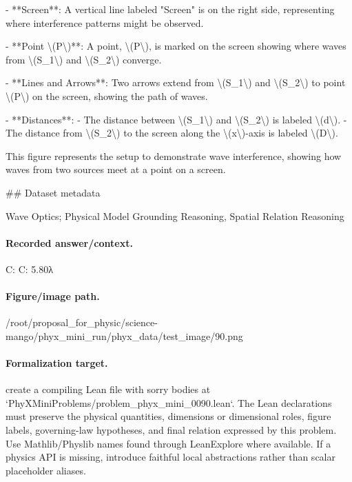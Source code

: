 - **Screen**: A vertical line labeled "Screen" is on the right side, representing where interference patterns might be observed.

- **Point \textbackslash{}(P\textbackslash{})**: A point, \textbackslash{}(P\textbackslash{}), is marked on the screen showing where waves from \textbackslash{}(S\_1\textbackslash{}) and \textbackslash{}(S\_2\textbackslash{}) converge.

- **Lines and Arrows**: Two arrows extend from \textbackslash{}(S\_1\textbackslash{}) and \textbackslash{}(S\_2\textbackslash{}) to point \textbackslash{}(P\textbackslash{}) on the screen, showing the path of waves.

- **Distances**: 
  - The distance between \textbackslash{}(S\_1\textbackslash{}) and \textbackslash{}(S\_2\textbackslash{}) is labeled \textbackslash{}(d\textbackslash{}).
  - The distance from \textbackslash{}(S\_2\textbackslash{}) to the screen along the \textbackslash{}(x\textbackslash{})-axis is labeled \textbackslash{}(D\textbackslash{}).

This figure represents the setup to demonstrate wave interference, showing how waves from two sources meet at a point on a screen.

\#\# Dataset metadata

Wave Optics; Physical Model Grounding Reasoning, Spatial Relation Reasoning

\paragraph{Recorded answer/context.}
C: C: 5.80λ

\paragraph{Figure/image path.}
/root/proposal\_for\_physic/science-mango/phyx\_mini\_run/phyx\_data/test\_image/90.png

\paragraph{Formalization target.}
create a compiling Lean file with sorry bodies at `PhyXMiniProblems/problem\_phyx\_mini\_0090.lean`. The Lean declarations must preserve the physical quantities, dimensions or dimensional roles, figure labels, governing-law hypotheses, and final relation expressed by this problem.
Use Mathlib/Physlib names found through LeanExplore where available. If a physics API is missing, introduce faithful local abstractions rather than scalar placeholder aliases.

